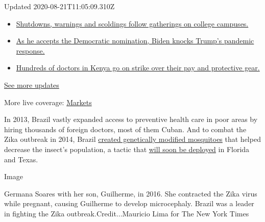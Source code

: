 Updated 2020-08-21T11:05:09.310Z

\begin{itemize}
\tightlist
\item
  \href{https://www.nytimes3xbfgragh.onion/2020/08/21/world/covid-19-coronavirus.html?action=click\&pgtype=Article\&state=default\&region=MAIN_CONTENT_1\&context=storylines_live_updates\#link-4690b6aa}{Shutdowns,
  warnings and scoldings follow gatherings on college campuses.}
\item
  \href{https://www.nytimes3xbfgragh.onion/2020/08/21/world/covid-19-coronavirus.html?action=click\&pgtype=Article\&state=default\&region=MAIN_CONTENT_1\&context=storylines_live_updates\#link-324af071}{As
  he accepts the Democratic nomination, Biden knocks Trump's pandemic
  response.}
\item
  \href{https://www.nytimes3xbfgragh.onion/2020/08/21/world/covid-19-coronavirus.html?action=click\&pgtype=Article\&state=default\&region=MAIN_CONTENT_1\&context=storylines_live_updates\#link-35890b73}{Hundreds
  of doctors in Kenya go on strike over their pay and protective gear.}
\end{itemize}

\href{https://www.nytimes3xbfgragh.onion/2020/08/21/world/covid-19-coronavirus.html?action=click\&pgtype=Article\&state=default\&region=MAIN_CONTENT_1\&context=storylines_live_updates}{See
more updates}

More live coverage:
\href{https://www.nytimes3xbfgragh.onion/live/2020/08/20/business/stock-market-today-coronavirus?action=click\&pgtype=Article\&state=default\&region=MAIN_CONTENT_1\&context=storylines_live_updates}{Markets}

In 2013, Brazil vastly expanded access to preventive health care in poor
areas by hiring thousands of foreign doctors, most of them Cuban. And to
combat the Zika outbreak in 2014, Brazil
\href{https://www.nytimes3xbfgragh.onion/2016/01/31/business/new-weapon-to-fight-zika-the-mosquito.html}{created
genetically modified mosquitoes} that helped decrease the insect's
population, a tactic that
\href{https://www.sciencetimes.com/articles/25601/20200506/genetically-engineered-male-mosquitos-released-florida-parts-country-curb-zika.htm}{will
soon be deployed} in Florida and Texas.

Image

Germana Soares with her son, Guilherme, in 2016. She contracted the Zika
virus while pregnant, causing Guilherme to develop microcephaly. Brazil
was a leader in fighting the Zika outbreak.Credit...Mauricio Lima for
The New York Times

